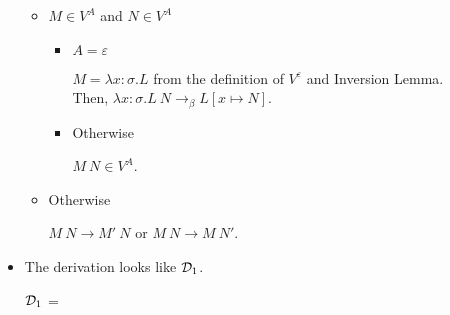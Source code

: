 \begin{itemize}
	      \begin{itemize}
	      	\item $M \in V^A$ and $N \in V^A$
	      	      	      	      	      	      	      	      	      	      	      	      	      	      	      	      		      	      	      	      	      	      	      	      
	      	      \begin{itemize}
	      	      	\item $A=\varepsilon$
	      	      	      	      	      	      	      	      	      	      	      	      	      	      	      	      	      	      	      	      	      	      	      	      		      	      	      	      	      	      	      	      	      	      	      	      
	      	      	      $M = \lambda x:\sigma.L$ from the definition of $V^\varepsilon$ and Inversion Lemma.\\
	      	      	      Then, $\lambda x:\sigma.L\ N \longrightarrow_\beta L[x\mapsto N]$.
	      	      	\item Otherwise
	      	      	      	      	      	      	      	      	      	      	      	      	      	      	      	      	      	      	      	      	      	      	      	      		      	      	      	      	      	      	      	      	      	      	      	      
	      	      	      $M\ N \in V^A$.
	      	      \end{itemize}
	      	\item Otherwise
	      	      	      	      	      	      	      	      	      	      	      	      	      	      	      	      		      	      	      	      	      	      	      	      
	      	      $M\ N \longrightarrow M'\ N$ or $M\ N \longrightarrow M\ N'$.
	      \end{itemize}
	      	      	      	      	      	      	      	      		      	      	      	      
	\item \TIns
	      	      	      	      	      	      	      	      		      	      	      	      
	      The derivation looks like $\mathcal{D}_1$.
	      	      	      	      	      	      	      	      		      	      	      	      
	      $\mathcal{D}_1$ = 
	      {}
	      	      	      	      	      	      	      	      		      	      	      	      

\end{itemize}
